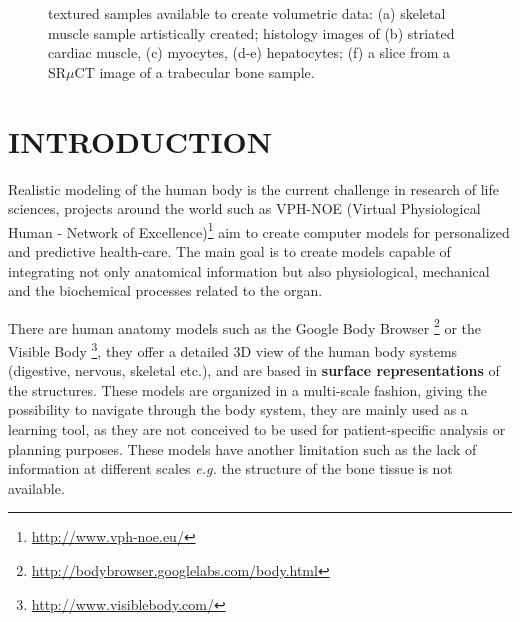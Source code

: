 \onecolumn \maketitle \normalsize \vfill

\begin{figure*}
 \centering 
 \caption{ textured samples available to create volumetric data: (a) skeletal muscle sample artistically created;
          histology images of (b) striated cardiac muscle, (c) myocytes, 
	  (d-e) hepatocytes; (f) a slice from a SR$\mu$CT image of a trabecular bone sample.
          }
 \label{fig:sampleimages}
\end{figure*}

\section{\uppercase{Introduction}}
\label{sec:Introduction}

Realistic modeling of the human body is the current challenge in research of life sciences, projects around the world 
such as VPH-NOE (Virtual Physiological Human - Network of Excellence)\footnote{\url{http://www.vph-noe.eu/}} 
aim to create computer models for personalized and predictive health-care. 
The main goal is to create models capable of integrating
not only anatomical information but also physiological, mechanical and the biochemical processes related to the organ.

There are human anatomy models such as the Google Body Browser \footnote{\url{http://bodybrowser.googlelabs.com/body.html}}
or the Visible Body \footnote{\url{http://www.visiblebody.com/}},
they offer a detailed 3D view of the human body systems (digestive, nervous, skeletal etc.), and are based in {\bf surface representations}
of the structures. These models are organized in a multi-scale fashion, giving the possibility to navigate through 
the body system, they are mainly used as a learning tool, as they are not conceived to be used for 
patient-specific analysis or planning purposes.
These models have another limitation such as the lack of information at different scales \emph{e.g.} the structure of the bone tissue is not available.

